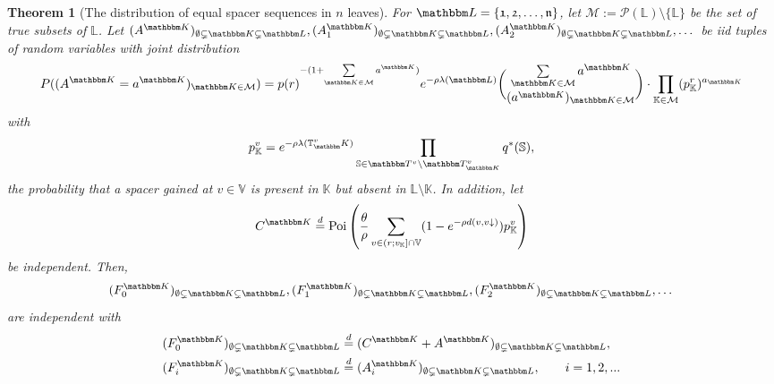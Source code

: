 \documentclass[preprint,authoryear]{elsarticle}
\newtheorem{theorem}{Theorem}
\theoremstyle{definition}
\numberwithin{equation}{section}
\numberwithin{figure}{section}
\begin{document}
\begin{theorem}[The distribution of equal spacer sequences in $n$ leaves\label{T:n}]
  For $\mathbbm L = \{\mathfrak 1, \mathfrak 2,\dots, \mathfrak n\}$, let
  $\mathcal M := \mathcal P(\mathbb L) \setminus \{\mathbb L\}$ be the
  set of true subsets of $\mathbb L$. Let
  $(A^{\mathbbm K})_{\emptyset\subsetneq \mathbbm K \subsetneq
    \mathbbm L}, (A_1^{\mathbbm K})_{\emptyset\subsetneq \mathbbm K
    \subsetneq \mathbbm L}, (A_2^{\mathbbm K})_{\emptyset\subsetneq
    \mathbbm K \subsetneq \mathbbm L},\dots$
  be iid tuples of random variables with joint distribution
  \begin{equation}
    \label{eq:general}
    P( (A^{\mathbbm K} = a^{\mathbbm K})_{\mathbbm K \in \mathcal M} )
    = p(r)^{-(1+\sum\limits_{\mathbbm K \in \mathcal M} a^{\mathbbm K})}
    e^{-\rho \lambda(\mathbbm L)}
    \binom{\sum\limits_{\mathbbm K \in \mathcal M} a^{\mathbbm K}}{(a^{\mathbbm K})_{\mathbbm K \in \mathcal M}}
    \cdot \prod_{\mathbb K \in \mathcal M} (p_{\mathbb K}^r)^{a_{\mathbbm K}}
  \end{equation}
  with 
  \begin{align*}
    p_{\mathbb K}^v = e^{-\rho \lambda(\mathbb T^v_\mathbbm K)}
    \prod\limits_{ \mathbb S \in \mathbbm T^v \setminus \mathbbm T^v_{\mathbbm K}} 
    q^\ast(\mathbb S),
  \end{align*}
  the probability that a spacer gained at $v\in\mathbb V$ is
  present in $\mathbb K$ but absent in $\mathbb L\setminus \mathbb K$.
  In addition, let
  \begin{align*}
    C^{\mathbbm K} \stackrel d = \text{Poi}\left(    \frac\theta\rho \sum_{v \in (r; v_{\mathbb K}]\cap \mathbb V} 
    (1-e^{-\rho d(v,v\downarrow)})
    p_{\mathbb K}^v\right)
  \end{align*}
  be independent. Then,
  $$ (F_0^{\mathbbm K})_{\emptyset \subsetneq \mathbbm K\subsetneq \mathbbm L}, 
  (F_1^{\mathbbm K})_{\emptyset \subsetneq \mathbbm K\subsetneq
    \mathbbm L}, (F_2^{\mathbbm K})_{\emptyset \subsetneq \mathbbm
    K\subsetneq \mathbbm L},\dots$$ are independent with
  \begin{align*}
    (F_0^{\mathbbm K})_{\emptyset \subsetneq \mathbbm K\subsetneq \mathbbm L} 
    & \stackrel d = (C^{\mathbbm K} + A^{\mathbbm K})_{\emptyset \subsetneq \mathbbm K\subsetneq \mathbbm L},
    \\ 
    (F_i^{\mathbbm K})_{\emptyset \subsetneq \mathbbm K\subsetneq \mathbbm L} 
    & \stackrel d = (A_i^{\mathbbm K})_{\emptyset \subsetneq \mathbbm K\subsetneq \mathbbm L}, \qquad i=1,2,...
  \end{align*}
\end{theorem}
\end{document}
